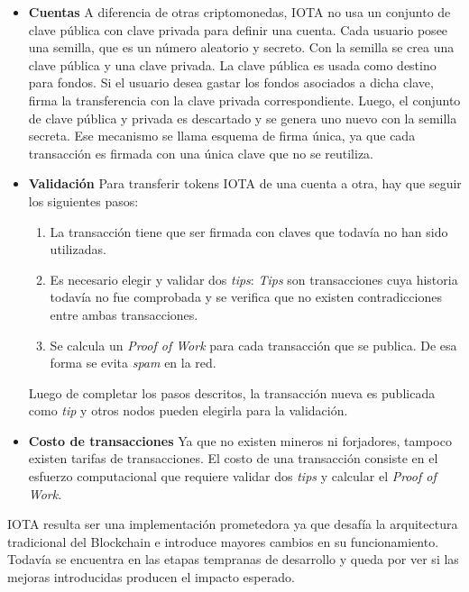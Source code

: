 \begin{itemize}
\item \textbf{Cuentas} \newline
A diferencia de otras criptomonedas, IOTA no usa un conjunto de clave pública con clave privada para definir una cuenta. Cada usuario posee una semilla, que es un número aleatorio y secreto. Con la semilla se crea una clave pública y una clave privada. La clave pública es usada como destino para fondos. Si el usuario desea gastar los fondos asociados a dicha clave, firma la transferencia con la clave privada correspondiente. Luego, el conjunto de clave pública y privada es descartado y se genera uno nuevo con la semilla secreta. Ese mecanismo se llama esquema de firma única, ya que cada transacción es firmada con una única clave que no se reutiliza.

\item \textbf{Validación} \newline
Para transferir tokens IOTA de una cuenta a otra, hay que seguir los siguientes pasos:
\begin{enumerate}
\item La transacción tiene que ser firmada con claves que todavía no han sido utilizadas.
\item Es necesario elegir y validar dos \textit{tips}: \textit{Tips} son transacciones cuya historia todavía no fue comprobada y se verifica que no existen contradicciones entre ambas transacciones.
\item Se calcula un \textit{Proof of Work} para cada transacción que se publica. De esa forma se evita \textit{spam} en la red.
\end{enumerate}
Luego de completar los pasos descritos, la transacción nueva es publicada como \textit{tip} y otros nodos pueden elegirla para la validación. 

\item \textbf{Costo de transacciones} \newline
Ya que no existen mineros ni forjadores, tampoco existen tarifas de transacciones. El costo de una transacción consiste en el esfuerzo computacional que requiere validar dos \textit{tips} y calcular el \textit{Proof of Work}.
\end{itemize}

IOTA resulta ser una implementación prometedora ya que desafía la arquitectura tradicional del Blockchain e introduce mayores cambios en su funcionamiento. Todavía se encuentra en las etapas tempranas de desarrollo y queda por ver si las mejoras introducidas producen el impacto esperado.


